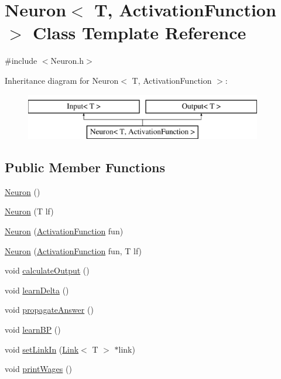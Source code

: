\hypertarget{class_neuron}{\section{\-Neuron$<$ \-T, \-Activation\-Function $>$ \-Class \-Template \-Reference}
\label{class_neuron}
}


{\ttfamily \#include $<$\-Neuron.\-h$>$}

\-Inheritance diagram for \-Neuron$<$ \-T, \-Activation\-Function $>$\-:\begin{figure}[H]
\begin{center}
\leavevmode
\includegraphics[height=2.000000cm]{class_neuron}
\end{center}
\end{figure}
\subsection*{\-Public \-Member \-Functions}
\begin{DoxyCompactItemize}
\item 
\hyperlink{class_neuron_ada8bb503f1bd56ce2596eabf8c21877e}{\-Neuron} ()
\item 
\hyperlink{class_neuron_a6145b98854c0fb6e9cfe09336952a5dc}{\-Neuron} (\-T lf)
\item 
\hyperlink{class_neuron_afff69f38459625c7d376e5f5e2e34a9d}{\-Neuron} (\hyperlink{class_activation_function}{\-Activation\-Function} fun)
\item 
\hyperlink{class_neuron_a1c7ea1b973546b185e6ec0c29b740453}{\-Neuron} (\hyperlink{class_activation_function}{\-Activation\-Function} fun, \-T lf)
\item 
void \hyperlink{class_neuron_a36c60982cb604f2fa6a1765177a9c2e7}{calculate\-Output} ()
\item 
void \hyperlink{class_neuron_ae73a056c55311521d0e31347837109cc}{learn\-Delta} ()
\item 
void \hyperlink{class_neuron_acb55ff03a770877b6afb86ed4d06896a}{propagate\-Answer} ()
\item 
void \hyperlink{class_neuron_a5e479fce295d76be68c017ab8c986f8c}{learn\-B\-P} ()
\item 
void \hyperlink{class_neuron_a1a20d9ac9bf64126f8d74d8c1c7d3c58}{set\-Link\-In} (\hyperlink{class_link}{\-Link}$<$ \-T $>$ $\ast$link)
\item 
void \hyperlink{class_neuron_ac112e85f169835dad11a6f7bd9e477b9}{print\-Wages} ()
\end{DoxyCompactItemize}


